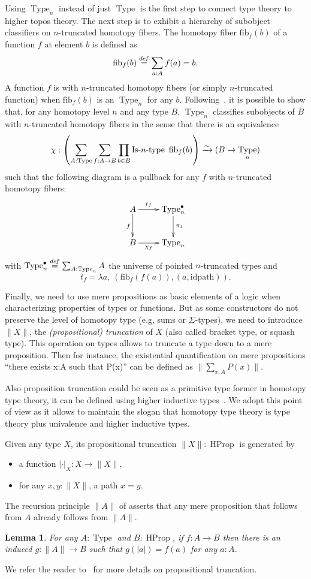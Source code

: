 \documentclass[conference]{IEEEtran}
\newtheorem{lem}[thm]{Lemma}
\newcommand \defeq {\overset{de\hspace{-0.2ex}f}{=}}
\newcommand{\eg}{e.g,\xspace}
\DeclareMathOperator{\Type}{Type}
\DeclareMathOperator{\HProp}{HProp}
\def\mymathhyphen{{\hbox{-}}}
\newcommand{\IsType}[1]
{\mathop{\mathrm{Is\mymathhyphen}#1\mathrm{\mymathhyphen type}} }
\newcommand \squash[1] {\| #1 \| }
\newcommand \fib[2] {\mathrm{fib}_{#1}(#2)}
\begin{document}
Using $\Type_n$ instead of just $\Type$ is the first step to connect
type theory to higher topos theory. The next step is to exhibit a
hierarchy of subobject classifiers on $n$-truncated homotopy fibers.
%
The homotopy fiber $\fib{f}{b}$ of a function $f$ at element $b$ is
defined as 
$$
\fib{f}{b} \defeq \sum_{a:A} f(a) = b.
$$ 
%
A function $f$ is with $n$-truncated homotopy fibers (or simply
$n$-truncated function) when $\fib{f}{b}$
is an $\Type_n$ for any $b$.  
%
Following~\cite{sets_in_hott}, it is possible to show that, for any
homotopy level $n$ and any type $B$, $\Type_n$ classifies subobjects
of $B$ with $n$-truncated homotopy fibers in the sense that there is
an equivalence
%
$$\chi : \left(\sum_{A:\Type} \sum_{f:A \to B} \prod_{b\in B}
\IsType n\
\fib{f}{b}\right) \xrightarrow{\sim} 
 (B \to \Type_n)$$
%
 such that the following diagram is a pullback for any $f$ with
 $n$-truncated homotopy fibers:
$$
\xymatrix{
  A \ar[r]^{\hspace{-1em} t_f} \ar[d]_f & \Type_n^\bullet \ar[d]^{\pi_1}\\
  B \ar[r]_{\hspace{-1em} \chi_f} & \Type_n
}
$$
with $\Type_n^\bullet \defeq \sum_{A:\Type_n} A$ the universe of pointed
$n$-truncated types and 
$$t_f = \lambda a,~(\fib{f}{f(a)},(a,\mathrm{idpath})).$$

Finally, we need to use mere propositions as basic elements of a logic
when characterizing properties of types or functions. 
%
But as some constructors do not preserve the level of homotopy type
(\eg sums or $\Sigma$-types), we need to introduce $\squash{X}$, the
{\em (propositional) truncation} of $X$ (also called bracket type, or
squash type). This operation on types allows to truncate a type down
to a mere proposition. Then for instance, the existential
quantification on mere propositions ``there exists x:A such that
P(x)'' can be defined as $ \squash{\sum_{x:A} P(x)}.  $

Also proposition truncation could be seen as a primitive type former
in homotopy type theory, it can be defined using higher inductive
types~\cite{lumsdaine2011higher,lumsdaine2013higher}. We adopt this
point of view as it allows to maintain the slogan that homotopy type
theory is type theory plus univalence and higher inductive types.
%

Given any type $X$, its propositional truncation 
$\squash{X} : \HProp$ is generated by 
\begin{itemize}
\item a function $|\cdot|_X : X \to \squash{X}$,
\item for any $x,y:\squash{X}$, a path $x=y$.
\end{itemize}
% 
The recursion principle $\squash{A}$ of asserts that any mere
proposition that follows from $A$ already follows from $\squash{A}$.
\begin{lem}
  For any $A:\Type$ and $B:\HProp$, if $f:A \to B$ then there is an
  induced $g:\squash{A}\to B$ such that $g(|a|)= f(a)$ for any $a:A$.
\end{lem}
%
We refer the reader to~\cite{hottbook} for more details on propositional truncation.
\end{document}

